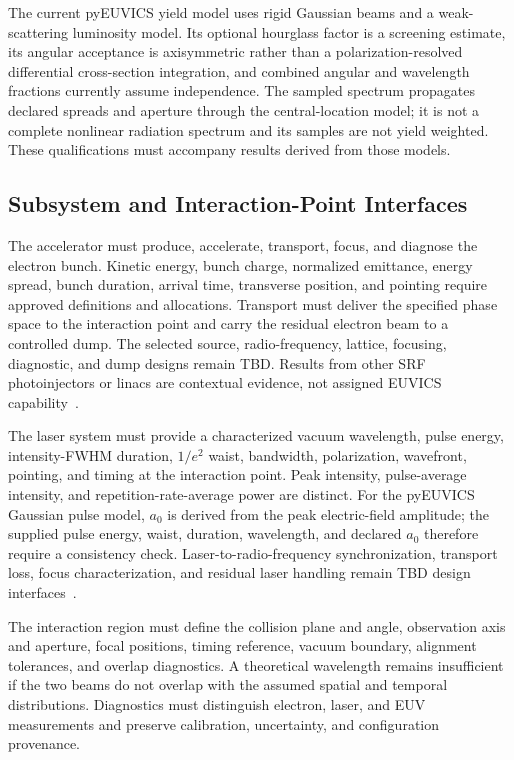The current pyEUVICS yield model uses rigid Gaussian beams and a weak-scattering
luminosity model. Its optional hourglass factor is a screening estimate, its
angular acceptance is axisymmetric rather than a polarization-resolved
differential cross-section integration, and combined angular and wavelength
fractions currently assume independence. The sampled spectrum propagates
declared spreads and aperture through the central-location model; it is not a
complete nonlinear radiation spectrum and its samples are not yield weighted.
These qualifications must accompany results derived from those models.

\subsection{Subsystem and Interaction-Point Interfaces}

The accelerator must produce, accelerate, transport, focus, and diagnose the
electron bunch. Kinetic energy, bunch charge, normalized emittance, energy
spread, bunch duration, arrival time, transverse position, and pointing require
approved definitions and allocations. Transport must deliver the specified
phase space to the interaction point and carry the residual electron beam to a
controlled dump. The selected source, radio-frequency, lattice, focusing,
diagnostic, and dump designs remain TBD. Results from other SRF photoinjectors
or linacs are contextual evidence, not assigned EUVICS capability~\cite{ArnoldTeichert2011SRFPhotoinjectors,PetrushinaEtAl2020SRFGun,CiovatiEtAl2018LowEnergySRFLinac}.

The laser system must provide a characterized vacuum wavelength, pulse energy,
intensity-FWHM duration, $1/e^2$ waist, bandwidth, polarization, wavefront,
pointing, and timing at the interaction point. Peak intensity, pulse-average
intensity, and repetition-rate-average power are distinct. For the pyEUVICS
Gaussian pulse model, $a_0$ is derived from the peak electric-field amplitude;
the supplied pulse energy, waist, duration, wavelength, and declared $a_0$
therefore require a consistency check. Laser-to-radio-frequency synchronization,
transport loss, focus characterization, and residual laser handling remain TBD
design interfaces~\cite{FilippettoEtAl2022UED,pyEUVICSModels050}.

The interaction region must define the collision plane and angle, observation
axis and aperture, focal positions, timing reference, vacuum boundary, alignment
tolerances, and overlap diagnostics. A theoretical wavelength remains
insufficient if the two beams do not overlap with the assumed spatial and
temporal distributions. Diagnostics must distinguish electron, laser, and EUV
measurements and preserve calibration, uncertainty, and configuration provenance.

